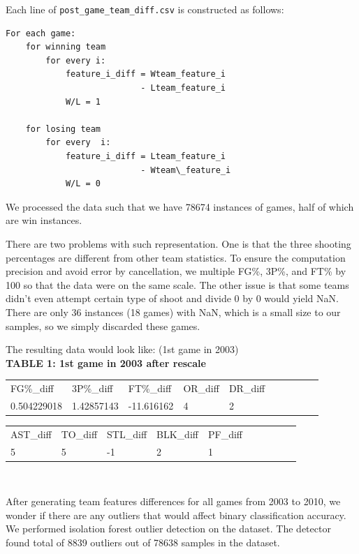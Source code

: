 \documentclass[12pt]{article}
\begin{document}
\quad Each line of \texttt{post\_game\_team\_diff.csv} is constructed as follows: \\


\lstset{language=Python, upquote=true}
\begin{lstlisting}[basicstyle=\small\tt]
For each game:
    for winning team
        for every i:
            feature_i_diff = Wteam_feature_i 
                           - Lteam_feature_i 
            W/L = 1 

    for losing team
        for every  i: 
            feature_i_diff = Lteam_feature_i 
                           - Wteam\_feature_i
            W/L = 0
\end{lstlisting}

\quad We processed the data such that we have 78674 instances of games, half of which are win instances. 

\quad There are two problems with such representation. One is that the three shooting percentages are different from other team statistics. To ensure the computation precision and avoid error by cancellation, we multiple FG\%, 3P\%, and FT\% by 100 so that the data were on the same scale. The other issue is that some teams didn’t even attempt certain type of shoot and divide 0 by 0 would yield NaN. There are only 36 instances (18 games) with NaN, which is a small size to our samples, so we simply discarded these games.

The resulting data would look like: (1st game in 2003) \\ 

\textbf{TABLE 1: 1st game in 2003 after rescale }

\begin{table}[h]
\begin{tabular}{llllllllll}
FG\%\_diff  & 3P\%\_diff & FT\%\_diff & OR\_diff & DR\_diff \\
0.504229018 & 1.42857143 & -11.616162 & 4  & 2 
\end{tabular} 
\end{table}

\begin{table}[h]
\begin{tabular}{llllllllll}
AST\_diff & TO\_diff & STL\_diff & BLK\_diff& PF\_diff\\
5 &5 &-1 &2 &1
\end{tabular} \\
\end{table}


\quad After generating team features differences for all games from 2003 to 2010, we wonder if there are any outliers that would affect binary classification accuracy. We performed isolation forest outlier detection on the dataset. The detector found total of 8839 outliers out of 78638 samples in the dataset. 
\end{document}
